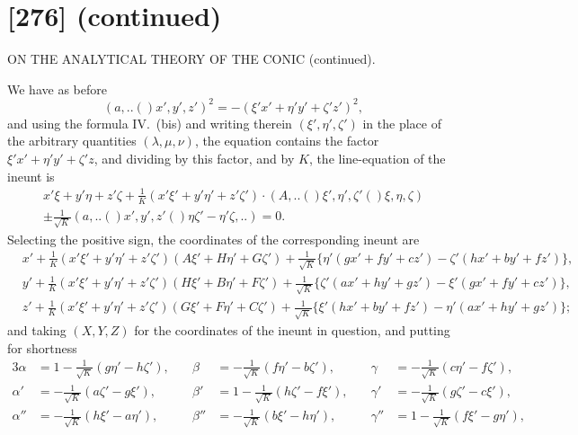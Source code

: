 \documentclass[11pt,a4paper]{book}
\providecommand{\qform}[1]{(#1)}
\begin{document}
\newpage
\section*{[276] (continued)}
\begin{center}
{\large ON THE ANALYTICAL THEORY OF THE CONIC (continued).}
\end{center}

We have as before
\[
(a,..\!\qform{}{x', y', z'})^{2} = -(\xi'x' + \eta'y' + \zeta'z')^{2},
\]
and using the formula IV.\ (bis) and writing therein $(\xi', \eta', \zeta')$ in the place of the arbitrary quantities $(\lambda, \mu, \nu)$, the equation contains the factor $\xi'x' + \eta'y' + \zeta'z$, and dividing by this factor, and by $K$, the line-equation of the ineunt is
\begin{multline*}
x'\xi + y'\eta + z'\zeta + \frac{1}{K}(x'\xi' + y'\eta' + z'\zeta') \cdot (A,..\!\qform{}{\xi', \eta', \zeta'}\!\qform{}{\xi, \eta, \zeta})\\
\pm \frac{1}{\sqrt{K}}(a,..\!\qform{}{x', y', z'}\!\qform{}{\eta\zeta' - \eta'\zeta,..}) = 0.
\end{multline*}
Selecting the positive sign, the coordinates of the corresponding ineunt are
\begin{align*}
&x' + \frac{1}{K}(x'\xi' + y'\eta' + z'\zeta')(A\xi' + H\eta' + G\zeta')
+ \frac{1}{\sqrt{K}}\{\eta'(gx' + fy' + cz') - \zeta'(hx' + by' + fz')\},\\
&y' + \frac{1}{K}(x'\xi' + y'\eta' + z'\zeta')(H\xi' + B\eta' + F\zeta')
+ \frac{1}{\sqrt{K}}\{\zeta'(ax' + hy' + gz') - \xi'(gx' + fy' + cz')\},\\
&z' + \frac{1}{K}(x'\xi' + y'\eta' + z'\zeta')(G\xi' + F\eta' + C\zeta')
+ \frac{1}{\sqrt{K}}\{\xi'(hx' + by' + fz') - \eta'(ax' + hy' + gz')\};
\end{align*}
and taking $(X, Y, Z)$ for the coordinates of the ineunt in question, and putting for shortness
\begin{alignat*}{3}
\alpha &= 1 - \tfrac{1}{\sqrt{K}}(g\eta' - h\zeta'), &\quad
\beta &= -\tfrac{1}{\sqrt{K}}(f\eta' - b\zeta'), &\quad
\gamma &= -\tfrac{1}{\sqrt{K}}(c\eta' - f\zeta'),\\[4pt]
\alpha' &= -\tfrac{1}{\sqrt{K}}(a\zeta' - g\xi'), &\quad
\beta' &= 1 - \tfrac{1}{\sqrt{K}}(h\zeta' - f\xi'), &\quad
\gamma' &= -\tfrac{1}{\sqrt{K}}(g\zeta' - c\xi'),\\[4pt]
\alpha'' &= -\tfrac{1}{\sqrt{K}}(h\xi' - a\eta'), &\quad
\beta'' &= -\tfrac{1}{\sqrt{K}}(b\xi' - h\eta'), &\quad
\gamma'' &= 1 - \tfrac{1}{\sqrt{K}}(f\xi' - g\eta'),
\end{alignat*}
\end{document}
